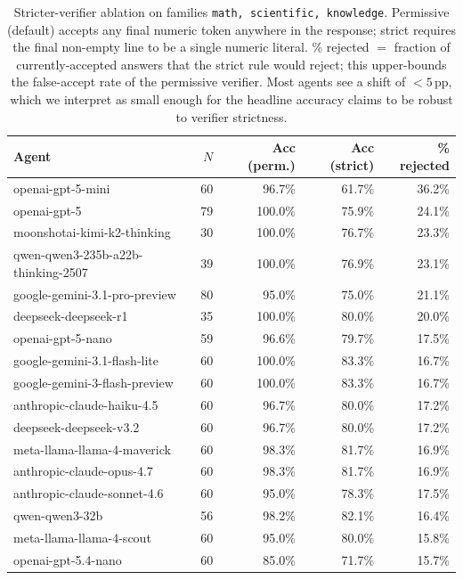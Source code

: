 \begin{table}[t]\centering\small
\caption{Stricter-verifier ablation on families \texttt{math, scientific, knowledge}. Permissive (default) accepts any final numeric token anywhere in the response; strict requires the final non-empty line to be a single numeric literal. \% rejected $=$ fraction of currently-accepted answers that the strict rule would reject; this upper-bounds the false-accept rate of the permissive verifier. Most agents see a shift of $<5$\,pp, which we interpret as small enough for the headline accuracy claims to be robust to verifier strictness.}
\label{tab:strict-verifier}
\begin{tabular}{lrrrr}
\toprule
Agent & $N$ & Acc (perm.) & Acc (strict) & \% rejected \\
\midrule
openai-gpt-5-mini & 60 & 96.7\% & 61.7\% & 36.2\%  \\
openai-gpt-5 & 79 & 100.0\% & 75.9\% & 24.1\%  \\
moonshotai-kimi-k2-thinking & 30 & 100.0\% & 76.7\% & 23.3\%  \\
qwen-qwen3-235b-a22b-thinking-2507 & 39 & 100.0\% & 76.9\% & 23.1\%  \\
google-gemini-3.1-pro-preview & 80 & 95.0\% & 75.0\% & 21.1\%  \\
deepseek-deepseek-r1 & 35 & 100.0\% & 80.0\% & 20.0\%  \\
openai-gpt-5-nano & 59 & 96.6\% & 79.7\% & 17.5\%  \\
google-gemini-3.1-flash-lite & 60 & 100.0\% & 83.3\% & 16.7\%  \\
google-gemini-3-flash-preview & 60 & 100.0\% & 83.3\% & 16.7\%  \\
anthropic-claude-haiku-4.5 & 60 & 96.7\% & 80.0\% & 17.2\%  \\
deepseek-deepseek-v3.2 & 60 & 96.7\% & 80.0\% & 17.2\%  \\
meta-llama-llama-4-maverick & 60 & 98.3\% & 81.7\% & 16.9\%  \\
anthropic-claude-opus-4.7 & 60 & 98.3\% & 81.7\% & 16.9\%  \\
anthropic-claude-sonnet-4.6 & 60 & 95.0\% & 78.3\% & 17.5\%  \\
qwen-qwen3-32b & 56 & 98.2\% & 82.1\% & 16.4\%  \\
meta-llama-llama-4-scout & 60 & 95.0\% & 80.0\% & 15.8\%  \\
openai-gpt-5.4-nano & 60 & 85.0\% & 71.7\% & 15.7\%  \\
\bottomrule
\end{tabular}
\end{table}